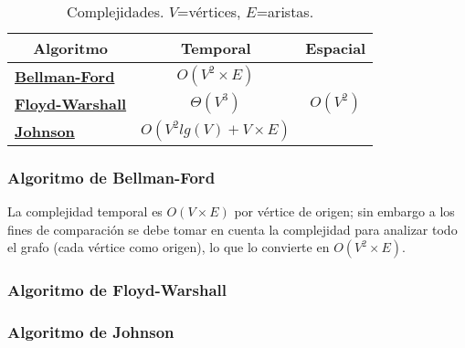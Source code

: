 \documentclass[../tp2_grupo404.tex]{subfiles}
\begin{document}
\begin{table}[H]
    \centering
    \begin{tabular}{@{}lcc@{}}
    \toprule
    \multicolumn{1}{c}{\textbf{Algoritmo}} & \textbf{Temporal}          & \textbf{Espacial} \\ \midrule
    \hyperref[sec:complej_Bellman]{\textbf{Bellman-Ford}}                  & $O(V^2\times E)$           &                   \\
    \hyperref[sec:complej_Floyd]{\textbf{Floyd-Warshall}}                & $\Theta(V^3)$              & $O(V^2)$          \\
    \hyperref[sec:complej_Johnson]{\textbf{Johnson}}                       & $O(V^2 lg(V) + V\times E)$ &                   \\ \bottomrule
    \end{tabular}
    \caption{\label{tabComplejidades}Complejidades. $V$=vértices, $E$=aristas.}
\end{table}

\subsubsection{Algoritmo de Bellman-Ford}\label{sec:complej_Bellman}
La complejidad temporal es $O(V\times E)$ por vértice de origen;
sin embargo a los fines de comparación se debe tomar en cuenta
la complejidad para analizar todo el grafo (cada vértice como origen),
lo que lo convierte en $O(V^2\times E)$.

\subsubsection{Algoritmo de Floyd-Warshall}\label{sec:complej_Floyd}

\subsubsection{Algoritmo de Johnson}\label{sec:complej_Johnson}

\end{document}
